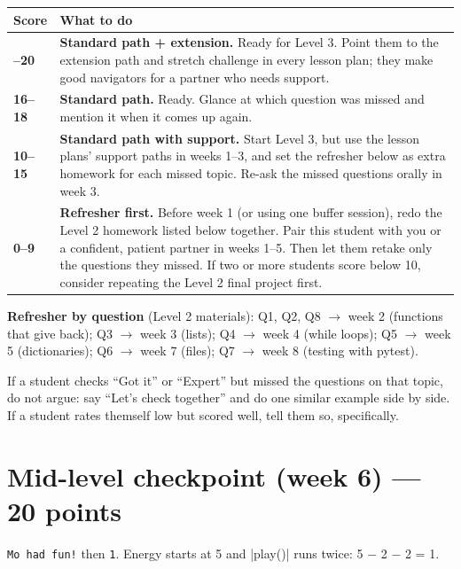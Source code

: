 \renewcommand{\arraystretch}{1.3}
\begin{longtable}{@{}>{\bfseries}p{2.2cm}p{\dimexpr\linewidth-2.2cm-2\tabcolsep}@{}}
\toprule
\rowcolor{kcaccent!15} Score & What to do\\ \midrule\endhead
\bottomrule\endfoot
19--20 & \textbf{Standard path + extension.} Ready for Level 3. Point them to the extension path and
stretch challenge in every lesson plan; they make good navigators for a partner who needs support.\\ \midrule
16--18 & \textbf{Standard path.} Ready. Glance at which question was missed and mention it when it
comes up again.\\ \midrule
10--15 & \textbf{Standard path with support.} Start Level 3, but use the lesson plans' support paths
in weeks 1--3, and set the refresher below as extra homework for each missed topic. Re-ask the
missed questions orally in week 3.\\ \midrule
0--9 & \textbf{Refresher first.} Before week 1 (or using one buffer session), redo the Level 2
homework listed below together. Pair this student with you or a confident, patient partner in
weeks 1--5. Then let them retake only the questions they missed.
If two or more students score below 10, consider repeating the Level 2 final project first.\\
\end{longtable}

\textbf{Refresher by question} (Level 2 materials):
Q1, Q2, Q8 $\rightarrow$ week 2 (functions that give back);
Q3 $\rightarrow$ week 3 (lists);
Q4 $\rightarrow$ week 4 (while loops);
Q5 $\rightarrow$ week 5 (dictionaries);
Q6 $\rightarrow$ week 7 (files);
Q7 $\rightarrow$ week 8 (testing with pytest).

\begin{tip}
If a student checks \enquote{Got it} or \enquote{Expert} but missed the questions on that topic, do
not argue: say \enquote{Let's check together} and do one similar example side by side. If a
student rates themself low but scored well, tell them so, specifically.
\end{tip}

\section{Mid-level checkpoint (week 6) --- 20 points}

\begin{answer}
\texttt{Mo had fun!} then \texttt{1}. Energy starts at 5 and \py|play()| runs twice: 5 $-$ 2 $-$ 2 = 1.
\end{answer}

